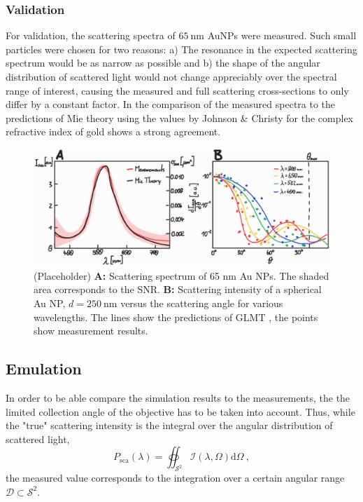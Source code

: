 \documentclass[10pt]{article}
\begin{document}
\begin{multicols}{2}
\subsubsection*{Validation}

For validation, the scattering spectra of $\SI{65}{\nano\meter}$ AuNPs were measured. 
Such small particles were chosen for two reasons: 
a) The resonance in the expected scattering spectrum would be as narrow as possible and b) the shape of the angular distribution of scattered light would not change appreciably over the spectral range of interest, causing the measured and full scattering cross-sections to only differ by a constant factor. 
In the comparison of the measured spectra to the predictions of Mie theory \cite{Mie1908, BohrenHuffman, GouesbetGrehan} using the values by Johnson \& Christy \cite{Johnson1972} for the complex refractive index of gold shows a strong agreement. 

\begin{figure}[t]
    \centering
    \includegraphics[width=\textwidth]{[fig] AuNP (placeholder).jpg}
    \caption{(Placeholder) 
    {\sffamily\bfseries A:} Scattering spectrum of 65 nm Au NPs. The shaded area corresponds to the SNR. 
    {\sffamily\bfseries B:} Scattering intensity of a spherical Au NP, $d=\SI{250}{\nano\meter}$ versus the scattering angle for various wavelengths. The lines show the predictions of GLMT \cite{GouesbetGrehan}, the points show measurement results.
    }
    \label{fig:AuNP}
\end{figure}








\subsection*{Emulation}

In order to be able compare the simulation results to the measurements, the the limited collection angle of the objective has to be taken into account. 
Thus, while the "true" scattering intensity is the integral over the angular distribution of scattered light, 
$$
    P_\mathrm{sca}(\lambda) = \oiint_{\mathcal{S}^2} \mathcal{I}(\lambda, \Omega) \mathrm{d}\Omega \ ,
$$
the measured value corresponds to the integration over a certain angular range $\mathcal{D} \subset \mathcal{S}^2$. 


\end{multicols}
\end{document}
